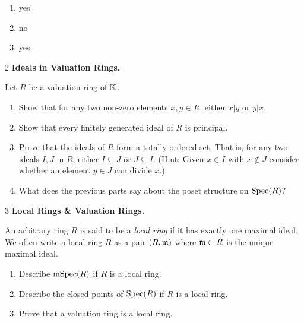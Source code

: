 \documentclass[Notebook.tex]{subfiles}
\begin{document}
    \begin{solution}
        \bbni  \todo{}
        \begin{enumerate}[label=(\alph*),ref=\theenumi\alph*]
            \item yes
            \item no
            \item yes
        \end{enumerate}
    \end{solution}

    \begin{problem}{2}
        \textbf{Ideals in Valuation Rings.} 
        
        Let $R$ be a valuation ring of $\mathbb K$. 
        \begin{enumerate}[label=(\alph*),ref=\theenumi\alph*]
        \item Show that for any two non-zero elements $x, y \in R$, either $x|y$ or $y|x$.
        \item Show that every finitely generated ideal of  $R$  is principal.
        \item Prove that the ideals of $R$ form a totally ordered set. That is, for any two ideals $I, J$ in $R$, either $I \subseteq J$ or $J\subseteq I$. (Hint: Given $x\in I$ with $x\not\in J$ consider whether an element $y\in J$ can divide $x$.)
        \item What does the previous parts say about the poset structure on $\operatorname{Spec}(R)$?
    \end{enumerate}
    \end{problem}

    \begin{problem}{3}
        \textbf{Local Rings \& Valuation Rings.} 
        
        An arbitrary ring $R$ is said to be a \emph{local ring} if it has exactly one maximal ideal. We often write a local ring $R$ as a pair $(R,\operatorname{\mathfrak{m}})$ where $\operatorname{\mathfrak{m}} \subset R$ is the unique maximal ideal. 
        \begin{enumerate}[label=(\alph*),ref=\theenumi\alph*]
            \item Describe $\operatorname{mSpec}(R)$ if $R$ is a local ring.
            \item Describe the closed points of $\operatorname{Spec}(R)$ if $R$ is a local ring. 
            \item Prove that a valuation ring is a local ring. 
        \end{enumerate}
    \end{problem}
\end{document}
